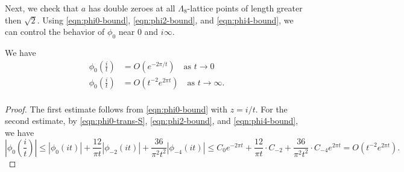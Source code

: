 Next, we check that $a$ has double zeroes at all $\Lambda_8$-lattice points of length greater then $\sqrt{2}$.
Using \eqref{eqn:phi0-bound}, \eqref{eqn:phi2-bound}, and \eqref{eqn:phi4-bound}, we can control the behavior of $\phi_0$ near $0$ and $i\infty$.

\begin{corollary}\label{cor:phi0-near-0-infty}\leanok
We have
\begin{align}
    \phi_0\left(\frac{i}{t}\right) &= O(e^{-2 \pi / t}) \quad \text{as } t \to 0 \label{eqn:phi0-near-0} \\
    \phi_0\left(\frac{i}{t}\right) &= O(t^{-2}e^{2 \pi t}) \quad \text{as } t \to \infty. \label{eqn:phi0-near-infty} \\
\end{align}
\end{corollary}
\begin{proof}\leanok
The first estimate follows from \eqref{eqn:phi0-bound} with $z = i/t$.
For the second estimate, by \eqref{eqn:phi0-trans-S}, \eqref{eqn:phi2-bound}, and \eqref{eqn:phi4-bound}, we have
\begin{equation}
    \left|\phi_0\left(\frac{i}{t}\right)\right| \le |\phi_0(it)| + \frac{12}{\pi t} |\phi_{-2}(it)| + \frac{36}{\pi^2 t^2} |\phi_{-4}(it)|
    \le C_0 e^{-2 \pi t} + \frac{12}{\pi t} \cdot C_{-2} + \frac{36}{\pi^2 t^2} \cdot C_{-4} e^{2 \pi t} = O(t^{-2}e^{2 \pi t}).
\end{equation}
\end{proof}

